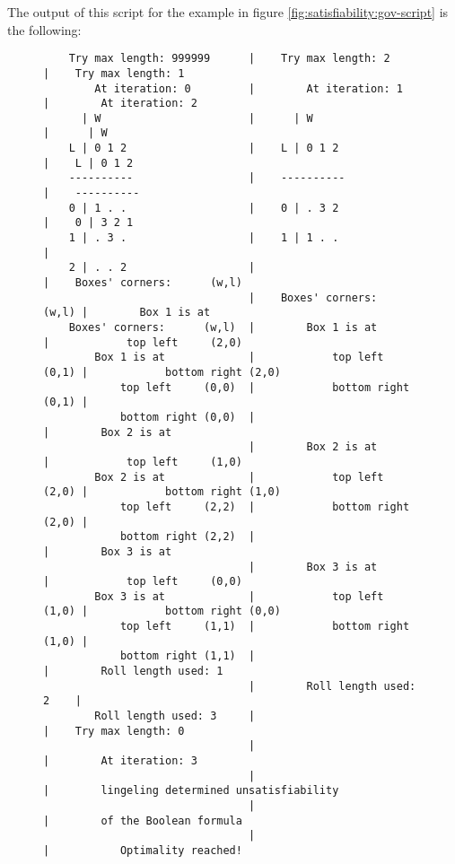 The output of this script for the example in figure \ref{fig:satisfiability:gov-script}
is the following:
\begin{figure}[H]
\centering
{\scriptsize
\begin{BVerbatim}
    Try max length: 999999      |    Try max length: 2          |    Try max length: 1
        At iteration: 0         |        At iteration: 1        |        At iteration: 2
      | W                       |      | W                      |      | W
    L | 0 1 2                   |    L | 0 1 2                  |    L | 0 1 2 
    ----------                  |    ----------                 |    ----------
    0 | 1 . .                   |    0 | . 3 2                  |    0 | 3 2 1 
    1 | . 3 .                   |    1 | 1 . .                  |    
    2 | . . 2                   |                               |    Boxes' corners:      (w,l)
                                |    Boxes' corners:      (w,l) |        Box 1 is at 
    Boxes' corners:      (w,l)  |        Box 1 is at            |            top left     (2,0)
        Box 1 is at             |            top left     (0,1) |            bottom right (2,0)
            top left     (0,0)  |            bottom right (0,1) |    
            bottom right (0,0)  |                               |        Box 2 is at 
                                |        Box 2 is at            |            top left     (1,0)
        Box 2 is at             |            top left     (2,0) |            bottom right (1,0)
            top left     (2,2)  |            bottom right (2,0) |    
            bottom right (2,2)  |                               |        Box 3 is at 
                                |        Box 3 is at            |            top left     (0,0)
        Box 3 is at             |            top left     (1,0) |            bottom right (0,0)
            top left     (1,1)  |            bottom right (1,0) |    
            bottom right (1,1)  |                               |        Roll length used: 1
                                |        Roll length used: 2    |
        Roll length used: 3     |                               |    Try max length: 0
                                |                               |        At iteration: 3
                                |                               |        lingeling determined unsatisfiability
                                |                               |        of the Boolean formula
                                |                               |           Optimality reached!
\end{BVerbatim}
}
\label{fig:satisfiability:gov-script:result}
\end{figure}

